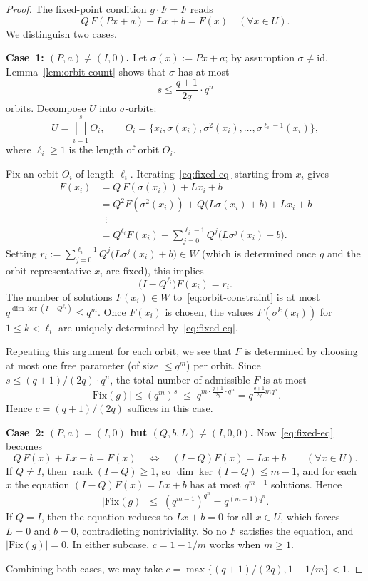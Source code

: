 \documentclass[11pt]{article}
\theoremstyle{definition}
\newcommand{\id}{\mathrm{id}}
\newcommand{\rank}{\operatorname{rank}}
\newcommand{\Fix}{\mathrm{Fix}}
\begin{document}
\begin{proof}
The fixed-point condition $g\cdot F=F$ reads
\begin{equation}\label{eq:fixed-eq}
   Q\,F(Px+a) + Lx + b = F(x)
   \quad(\forall x\in U).
\end{equation}
We distinguish two cases.

\medskip
\noindent\textbf{Case~1: $(P,a)\neq(I,0)$.}
Let $\sigma(x):=Px+a$; by assumption $\sigma\neq\id$.
Lemma~\ref{lem:orbit-count} shows that $\sigma$ has at most
\[
   s\le\frac{q+1}{2q}\cdot q^n
\]
orbits.
Decompose $U$ into $\sigma$-orbits:
\[
   U = \bigsqcup_{i=1}^s O_i,
   \qquad O_i = \{x_i,\sigma(x_i),\sigma^2(x_i),\dots,\sigma^{\ell_i-1}(x_i)\},
\]
where $\ell_i\ge 1$ is the length of orbit $O_i$.

Fix an orbit $O_i$ of length $\ell_i$.
Iterating~\eqref{eq:fixed-eq} starting from $x_i$ gives
\begin{align*}
   F(x_i)
      &= Q\,F(\sigma(x_i)) + Lx_i + b \\
      &= Q^2 F(\sigma^2(x_i)) + Q\bigl(L\sigma(x_i)+b\bigr) + Lx_i + b \\
      &\;\;\vdots \\
      &= Q^{\ell_i}F(x_i) + \sum_{j=0}^{\ell_i-1}Q^j\bigl(L\sigma^j(x_i)+b\bigr).
\end{align*}
Setting $r_i:=\sum_{j=0}^{\ell_i-1}Q^j\bigl(L\sigma^j(x_i)+b\bigr)\in W$ (which is
determined once $g$ and the orbit representative $x_i$ are fixed), this implies
\begin{equation}\label{eq:orbit-constraint}
   \bigl(I - Q^{\ell_i}\bigr) F(x_i) = r_i.
\end{equation}
The number of solutions $F(x_i)\in W$ to~\eqref{eq:orbit-constraint} is at most
$q^{\dim\ker(I-Q^{\ell_i})}\le q^m$.
Once $F(x_i)$ is chosen, the values $F(\sigma^k(x_i))$ for $1\le k<\ell_i$ are
uniquely determined by~\eqref{eq:fixed-eq}.

Repeating this argument for each orbit, we see that $F$ is determined by
choosing at most one free parameter (of size $\le q^m$) per orbit.
Since $s\le (q+1)/(2q)\cdot q^n$, the total number of admissible $F$ is at most
\[
   |\Fix(g)| \le (q^m)^s \;\le\; q^{m\cdot\frac{q+1}{2q}\cdot q^n}
   = q^{\frac{q+1}{2q}mq^n}.
\]
Hence $c=(q+1)/(2q)$ suffices in this case.

\medskip
\noindent\textbf{Case~2: $(P,a)=(I,0)$ but $(Q,b,L)\neq(I,0,0)$.}
Now~\eqref{eq:fixed-eq} becomes
\[
   Q\,F(x) + Lx + b = F(x)
   \quad\Longleftrightarrow\quad
   (I-Q)F(x) = Lx + b
   \qquad(\forall x\in U).
\]
If $Q\neq I$, then $\rank(I-Q)\ge 1$, so $\dim\ker(I-Q)\le m-1$, and for each
$x$ the equation $(I-Q)F(x)=Lx+b$ has at most $q^{m-1}$ solutions. Hence
\[
   |\Fix(g)| \;\le\; (q^{m-1})^{q^n} = q^{(m-1)q^n}.
\]
If $Q=I$, then the equation reduces to $Lx+b=0$ for all $x\in U$, which forces
$L=0$ and $b=0$, contradicting nontriviality. So no $F$ satisfies the equation,
and $|\Fix(g)|=0$.
In either subcase, $c = 1 - 1/m$ works when $m\ge 1$.

Combining both cases, we may take $c=\max\bigl\{(q+1)/(2q),1-1/m\bigr\}<1$.
\end{proof}
\end{document}
